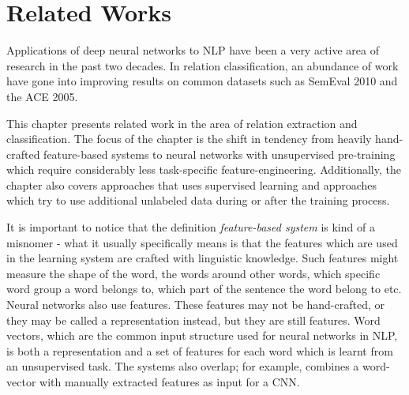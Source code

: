 
\chapter{Related Works}
\label{related_works}

Applications of deep neural networks to NLP have been a very active area of research in the past two decades. In relation classification, an abundance of work have gone into improving results on common datasets such as SemEval 2010 and the ACE 2005. 

This chapter presents related work in the area of relation extraction and classification. The focus of the chapter is the shift in tendency from heavily hand-crafted feature-based systems to neural networks with unsupervised pre-training which require considerably less task-specific feature-engineering. Additionally, the chapter also covers approaches that uses supervised learning and approaches which try to use additional unlabeled data during or after the training process.  

It is important to notice that the definition \emph{feature-based system} is kind of a misnomer - what it usually specifically means is that the features which are used in the learning system are crafted with linguistic knowledge. Such features might measure the shape of the word, the words around other words, which specific word group a word belongs to, which part of the sentence the word belong to etc. Neural networks also use features. These features may not be hand-crafted, or they may be called a representation instead, but they are still features. Word vectors, which are the common input structure used for neural networks in NLP, is both a representation and a set of features for each word which is learnt from an unsupervised task. The systems also overlap; for example, \cite{zeng2014} combines a word-vector with manually extracted features as input for a CNN.


 



